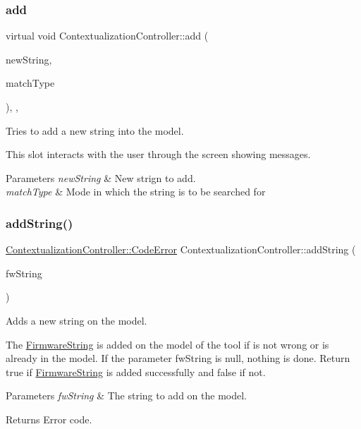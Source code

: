 \subsubsection{\texorpdfstring{add}{add}}
{\footnotesize\ttfamily virtual void Contextualization\+Controller\+::add (\begin{DoxyParamCaption}\item[{Q\+String}]{new\+String,  }\item[{int}]{match\+Type }\end{DoxyParamCaption})\hspace{0.3cm}{\ttfamily [protected]}, {}, {\ttfamily [slot]}}



Tries to add a new string into the model. 

This slot interacts with the user through the screen showing messages. 
\begin{DoxyParams}{Parameters}
{\em new\+String} & New strign to add. \\
\hline
{\em match\+Type} & Mode in which the string is to be searched for \\
\hline
\end{DoxyParams}
\mbox{\label{classContextualizationController_abb80030963c4abd056a200fefbf8b4e9}} 
\subsubsection{\texorpdfstring{add\+String()}{addString()}}
{\footnotesize\ttfamily \mbox{\hyperlink{classContextualizationController_acb38587f7f9e610a5950956b345d69fd}{Contextualization\+Controller\+::\+Code\+Error}} Contextualization\+Controller\+::add\+String (\begin{DoxyParamCaption}\item[{\mbox{\hyperlink{classFirmwareString}{Firmware\+String}} $\ast$}]{fw\+String }\end{DoxyParamCaption})\hspace{0.3cm}{\ttfamily [protected]}}



Adds a new string on the model. 

The \mbox{\hyperlink{classFirmwareString}{Firmware\+String}} is added on the model of the tool if is not wrong or is already in the model. If the parameter fw\+String is null, nothing is done. Return true if \mbox{\hyperlink{classFirmwareString}{Firmware\+String}} is added successfully and false if not. 
\begin{DoxyParams}{Parameters}
{\em fw\+String} & The string to add on the model. \\
\hline
\end{DoxyParams}
\begin{DoxyReturn}{Returns}
Error code. 
\end{DoxyReturn}


